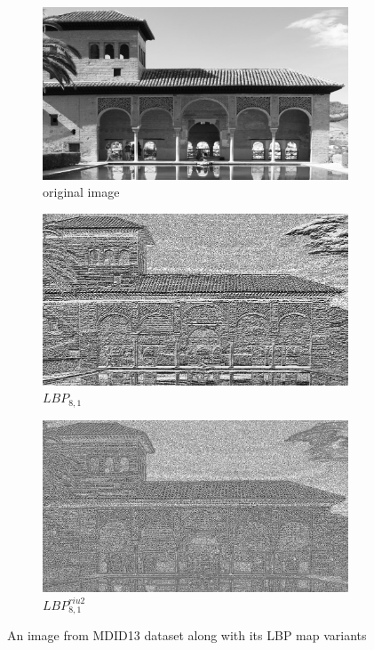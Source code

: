 \begin{figure}
     \centering
     \begin{subfigure}[b]{0.3\textwidth}
         \centering
         \includegraphics[width=\textwidth]{./figs/gry_org009}
         \caption{original image}
         \label{fig:lbp_orig}
     \end{subfigure}
     \hfill
     \begin{subfigure}[b]{0.3\textwidth}
         \centering
         \includegraphics[width=\textwidth]{./figs/lbp_org009}
         \caption{$LBP_{8,1}$}
         \label{fig:lbp_8,1}
     \end{subfigure}
     \hfill
     \begin{subfigure}[b]{0.3\textwidth}
         \centering
         \includegraphics[width=\textwidth]{./figs/lbpRIU2_org009}
         \caption{$LBP_{8,1}^{riu2}$}
         \label{fig:lbpriu2sample}
     \end{subfigure}
        \caption{An image from MDID13 dataset along with its LBP map variants}
        \label{fig:im&Lbp}
\end{figure}

